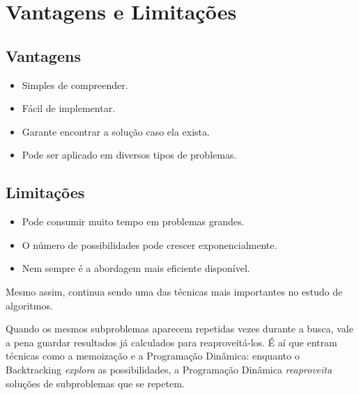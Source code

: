 \section{Vantagens e Limitações}

\subsection*{Vantagens}

\begin{itemize}[leftmargin=1.4em]
  \item Simples de compreender.
  \item Fácil de implementar.
  \item Garante encontrar a solução caso ela exista.
  \item Pode ser aplicado em diversos tipos de problemas.
\end{itemize}

\subsection*{Limitações}

\begin{atencao}[Limitações]
\begin{itemize}[leftmargin=1.4em]
  \item Pode consumir muito tempo em problemas grandes.
  \item O número de possibilidades pode crescer exponencialmente.
  \item Nem sempre é a abordagem mais eficiente disponível.
\end{itemize}
\end{atencao}

Mesmo assim, continua sendo uma das técnicas mais importantes no estudo de algoritmos.

\begin{ideiachave}
Quando os mesmos subproblemas aparecem repetidas vezes durante a busca, vale a pena guardar resultados já calculados para reaproveitá-los. É aí que entram técnicas como a memoização e a Programação Dinâmica: enquanto o Backtracking \emph{explora} as possibilidades, a Programação Dinâmica \emph{reaproveita} soluções de subproblemas que se repetem.
\end{ideiachave}
